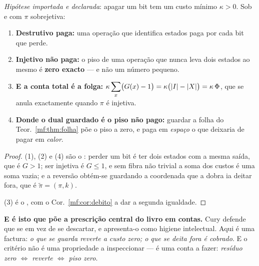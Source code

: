 \documentclass[../livro.tex]{subfiles}
\begin{document}
\begin{teorema}\label{mf:thm:custo}
\emph{Hipótese importada e declarada}: apagar um bit tem um custo mínimo
$\kappa>0$. Sob  e com $\pi$ sobrejetiva:
\begin{enumerate}\itemsep3pt
\item[(1)] \textbf{Destrutivo paga:} uma operação que identifica estados paga
por cada bit que perde.
\item[(2)] \textbf{Injetivo não paga:} o piso de uma operação que nunca leva dois
estados ao mesmo é \textbf{zero exacto} --- e não um número pequeno.
\item[(3)] \textbf{E a conta total é a folga:}
$\displaystyle\kappa\sum_x\bigl(G(x)-1\bigr)=\kappa\bigl(\lvert I\rvert-\lvert X\rvert\bigr)
=\kappa\,\Phi$, que se anula exactamente quando $\pi$ é injetiva.
\item[(4)] \textbf{Donde o dual guardado é o piso não pago:} guardar a folha do
Teor.~\ref{mf:thm:folha} põe o piso a zero, e paga em \emph{espaço} o que
deixaria de pagar em \emph{calor}.
\end{enumerate}
\end{teorema}

\begin{proof}
(1), (2) e (4) são o : perder um bit é ter dois estados com a mesma saída, que é $G>1$; ser
injetiva é $G\le1$, e sem fibra não trivial a soma dos custos é uma soma vazia;
e a reversão obtém-se guardando a coordenada que a dobra ia deitar fora, que é
$\tilde\pi=(\pi,k)$.

(3) é o , com o Cor.~\ref{mf:cor:debito} a dar a segunda
igualdade.
\end{proof}

\medskip\noindent\textbf{E é isto que põe a prescrição central do livro em
contas.} Cury defende que se  em vez de se
descartar, e apresenta-o como higiene intelectual. Aqui é uma factura: \emph{o
que se guarda reverte a custo zero; o que se deita fora é cobrado}. E o critério
não é uma propriedade a inspeccionar --- é uma conta a fazer:
\emph{resíduo zero $\Longleftrightarrow$ reverte $\Longleftrightarrow$ piso
zero}.
\end{document}
